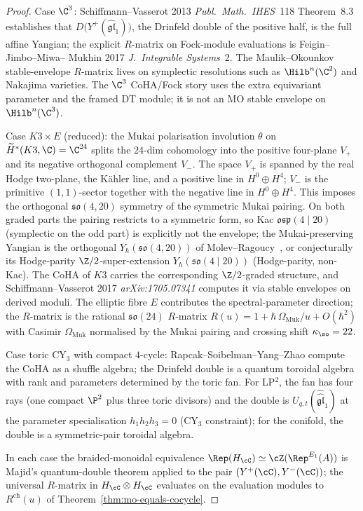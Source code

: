 \begin{proof}
Case $\C^3$: Schiffmann--Vasserot 2013 \emph{Publ.\ Math.\ IHES}~118
Theorem~8.3 establishes that
$D\bigl(Y^+(\widehat{\mathfrak{gl}}_1)\bigr)$, the Drinfeld double of
the positive half, is the full affine Yangian; the
	explicit $R$-matrix on Fock-module evaluations is Feigin--Jimbo--Miwa--
	Mukhin 2017 \emph{J.~Integrable Systems}~2.  The Maulik--Okounkov
	stable-envelope \(R\)-matrix lives on symplectic resolutions such as
	\(\Hilb^n(\C^2)\) and Nakajima varieties.  The \(\C^3\) CoHA/Fock
	story uses the extra equivariant parameter and the framed DT module;
	it is not an MO stable envelope on \(\Hilb^n(\C^3)\).

Case $K3 \times E$ (reduced): the Mukai polarisation involution
$\theta$ on $\widetilde H^*(K3, \C) = \C^{24}$ splits the $24$-dim
cohomology into the positive four-plane $V_+$ and its negative
orthogonal complement $V_-$. The space $V_+$ is spanned by the real
Hodge two-plane, the K\"ahler line, and a positive line in
$H^0\oplus H^4$; \(V_-\) is the primitive \((1,1)\)-sector together
with the negative line in \(H^0\oplus H^4\). This imposes the orthogonal
$\mathfrak{so}(4, 20)$ symmetry of the symmetric Mukai pairing. On
both graded parts the pairing restricts to a symmetric form, so Kac
$\mathfrak{osp}(4 \mid 20)$ (symplectic on the odd part) is
explicitly not the envelope; the Mukai-preserving Yangian is the
orthogonal $Y_\hbar(\mathfrak{so}(4, 20))$ of
Molev--Ragoucy~\cite{MolevRagoucy2008}, or conjecturally its
Hodge-parity $\Z/2$-super-extension
$Y_\hbar(\mathfrak{so}(4 \mid 20))$ (Hodge-parity, non-Kac).
The CoHA of $K3$ carries the corresponding $\Z/2$-graded structure,
and Schiffmann--Vasserot 2017 \emph{arXiv:1705.07341} computes it
via stable envelopes on derived moduli. The elliptic fibre $E$
contributes the spectral-parameter direction; the $R$-matrix is the
rational $\mathfrak{so}(24)$ $R$-matrix
$R(u) = 1 + \hbar\, \Omega_{\mathrm{Muk}}/u + O(\hbar^2)$ with
Casimir $\Omega_{\mathrm{Muk}}$ normalised by the Mukai pairing and
crossing shift $\kappa_{\so} = 22$.

Case toric CY$_3$ with compact $4$-cycle: Rapcak--Soibelman--Yang--Zhao
\cite{RSYZ2020} compute the CoHA as a shuffle algebra; the Drinfeld double
is a quantum toroidal algebra with rank and parameters determined by
the toric fan. For LP$^2$, the fan has four rays (one compact $\P^2$
plus three toric divisors) and the double is
$U_{q, t}(\widehat{\widehat{\mathfrak{gl}}}_1)$ at the parameter
specialisation $h_1 h_2 h_3 = 0$ (CY$_3$ constraint); for the conifold,
the double is a symmetric-pair toroidal algebra.

In each case the braided-monoidal equivalence
$\Rep(H_\cC) \simeq \cZ(\Rep^{E_1}(A))$ is Majid's quantum-double
theorem \cite[Thm.~7.1.1]{Majid1995} applied to the pair
$(Y^+(\cC), Y^-(\cC))$; the universal $R$-matrix in $H_\cC \otimes
H_\cC$ evaluates on the evaluation modules to $R^{\mathrm{ch}}(u)$
of Theorem~\ref{thm:mo-equals-cocycle}.
\end{proof}

